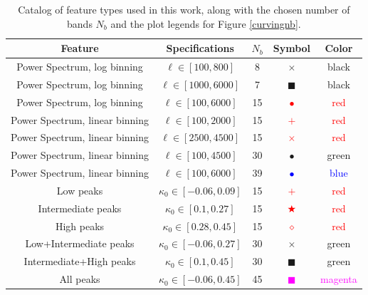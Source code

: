 \documentclass[reprint,aps,prd,superscriptaddress,showkeys,showpacs]{revtex4-1}
\begin{document}
\begin{table}
\begin{center}
\begin{tabular}{ccccc}
\toprule
\textbf{Feature} &  \textbf{Specifications} & $N_b$ &  \textbf{Symbol} & \textbf{Color} \\ \hline \hline
\midrule
Power Spectrum, log binning  & $\ell \in [100,800] $ & 8 & $\times$ & black  \\ 
Power Spectrum, log binning  & $\ell \in [1000,6000] $ & 7 & $\blacksquare$ & black  \\ 
Power Spectrum, log binning  & $\ell \in [100,6000] $ & 15 & \textcolor{red}{$\bullet$} & \textcolor{red}{red}  \\
Power Spectrum, linear binning  & $\ell \in [100,2000] $ & 15 & \textcolor{red}{$+$} & \textcolor{red}{red}  \\ 
Power Spectrum, linear binning  & $\ell \in [2500,4500] $ & 15 & \textcolor{red}{$\times$} & \textcolor{red}{red}  \\
Power Spectrum, linear binning  & $\ell \in [100,4500] $ & 30 & \textcolor{OliveGreen}{$\bullet$} & \textcolor{OliveGreen}{green}  \\ 
Power Spectrum, linear binning  & $\ell \in [100,6000] $ & 39 & \textcolor{blue}{$\bullet$} & \textcolor{blue}{blue}  \\ \hline
Low peaks  & $\kappa_0 \in [-0.06,0.09] $ & 15 & \textcolor{red}{$+$} & \textcolor{red}{red}  \\ 
Intermediate peaks  & $\kappa_0 \in [0.1,0.27] $ & 15 & \textcolor{red}{$\bigstar$} & \textcolor{red}{red}  \\ 
High peaks  & $\kappa_0 \in [0.28,0.45] $ & 15 & \textcolor{red}{$\diamond$} & \textcolor{red}{red}  \\
Low+Intermediate peaks  & $\kappa_0 \in [-0.06,0.27] $ & 30 & \textcolor{OliveGreen}{$\times$} & \textcolor{OliveGreen}{green}  \\
Intermediate+High peaks  & $\kappa_0 \in [0.1,0.45] $ & 30 & \textcolor{OliveGreen}{$\blacksquare$} & \textcolor{OliveGreen}{green}  \\
All peaks  & $\kappa_0 \in [-0.06,0.45] $ & 45 & \textcolor{magenta}{$\blacksquare$} & \textcolor{magenta}{magenta}  \\ \hline
\bottomrule
\end{tabular}
\end{center}
\caption{Catalog of feature types used in this work, along with the chosen number of bands $N_b$ and the plot legends for Figure \ref{curvingnb}.}
\label{featuretable}
\end{table}
\end{document}
